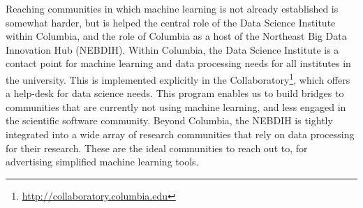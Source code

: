 \documentclass[11pt,letterpaper]{article}
\begin{document}
Reaching communities in which machine learning is not already established is somewhat
harder, but is helped the central role of the Data Science Institute within Columbia,
and the role of Columbia as a host of the Northeast Big Data Innovation Hub (NEBDIH).
Within Columbia, the Data Science Institute is a contact point for machine learning and
data processing needs for all institutes in the university. This is implemented
explicitly in the
Collaboratory\footnote{\url{http://collaboratory.columbia.edu}}, which offers a
help-desk for data science needs. This program enables us to build bridges to
communities that are currently not using machine learning, and less engaged
in the scientific software community.
Beyond Columbia, the NEBDIH is tightly integrated into a wide array of research
communities that rely on data processing for their research. These are the ideal
communities to reach out to, for advertising simplified machine learning tools.
\end{document}
